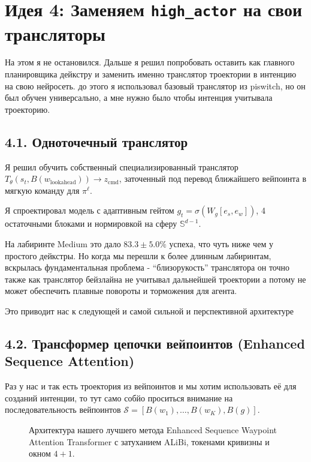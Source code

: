 \section{Идея 4: Заменяем \texttt{high\_actor} на свои трансляторы}

На этом я не остановился. Дальше я решил попробовать оставить как главного планировщика дейкстру и заменить именно транслятор троектории в интенцию на свою нейросеть. до этого я использовал базовый транслятор из piswitch, но он был обучен универсально, а мне нужно было чтобы интенция учитывала троекторию.

\subsection{4.1. Одноточечный транслятор}

Я решил обучить собственный специализированный транслятор $T_\theta(s_t, B(w_{\text{lookahead}})) \to z_{\text{cmd}}$, заточенный под перевод ближайшего вейпоинта в мягкую команду для $\pi^\ell$.

Я спроектировал модель с адаптивным гейтом $g_t = \sigma(W_g [e_s, e_w])$, 4 остаточными блоками и нормировкой на сферу $\mathbb{S}^{d-1}$. 

На лабиринте Medium это дало  $83.3 \pm 5.0\%$ успеха, что чуть ниже чем у простого дейкстры. Но когда мы перешли к более длинным лабиринтам, вскрылась фундаментальная проблема - \enquote{близорукость} транслятора он точно также как транслятор бейзлайна не учитывал дальнейшей троектории а потому не может обеспечить плавные повороты и торможения для агента.

Это приводит нас к следующей и самой сильной и перспективной архитектуре

\subsection{4.2. Трансформер цепочки вейпоинтов (Enhanced Sequence Attention)}

Раз у нас и так есть троектория из вейпоинтов и мы хотим использовать её для созданий интенции, то тут само собйо проситься внимание на последовательность вейпоинтов $\mathcal{S} = [B(w_1), \dots, B(w_K), B(g)]$.

\begin{figure}[t]
    \centering
    
    \caption{Архитектура нашего лучшего метода Enhanced Sequence Waypoint Attention Transformer с затуханием ALiBi, токенами кривизны и окном $4+1$.}
    \label{fig:seq_transformer}
\end{figure}

